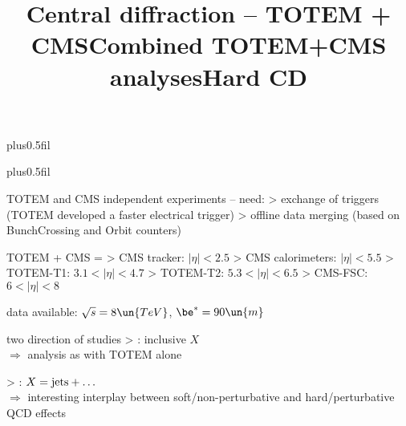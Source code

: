 \newpage %
\hbox{}
\vfil
\title{Central diffraction -- TOTEM + CMS}

\vskip0pt plus0.5fil

\vskip0pt plus0.5fil


\newpage %
\title{Combined TOTEM+CMS analyses}

\> TOTEM and CMS independent experiments --  need:
\>> exchange of triggers (TOTEM developed a faster electrical trigger)
\>> offline data merging (based on BunchCrossing and Orbit counters)

\vfil
\> TOTEM + CMS = 
\>> CMS tracker: $|η| < 2.5$
\>> CMS calorimeters: $|η| < 5.5$
\>> TOTEM-T1: $3.1 < |η| < 4.7$
\>> TOTEM-T2: $5.3 < |η| < 6.5$
\>> CMS-FSC: $6 < |η| < 8$

\vfil
\> data available: $\sqrt s = 8\un{TeV}$, $\be^* = 90\un{m}$

\vfil
\> two direction of studies
\>> : inclusive $X$\\
$\Rightarrow$ analysis as with TOTEM alone

\>> : $X = \hbox{jets} + \ldots$\\
$\Rightarrow$ interesting interplay between soft/non-perturbative and hard/perturbative QCD effects


\newpage %
\title{Hard CD}

\vskip-3mm


